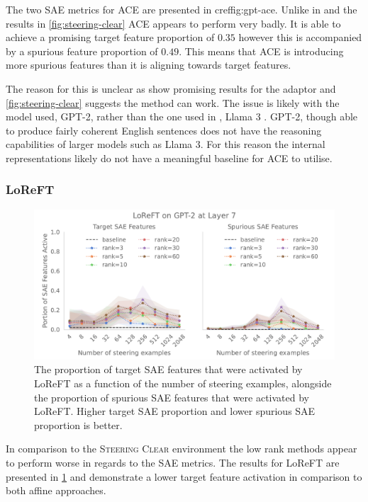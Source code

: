The two SAE metrics for ACE are presented in cref{fig:gpt-ace}.
Unlike in \citet{ace} and the results in \cref{fig:steering-clear} ACE appears to perform very badly.
It is able to achieve a promising target feature proportion of $0.35$ however this is accompanied by a spurious feature proportion of $0.49$.
This means that ACE is introducing more spurious features than it is aligning towards target features.

The reason for this is unclear as \citet{ace} show promising results for the adaptor and \cref{fig:steering-clear} suggests the method can work.
The issue is likely with the model used, GPT-2, rather than the one used in \citet{ace}, Llama 3 \citep{llama3}.
GPT-2, though able to produce fairly coherent English sentences does not have the reasoning capabilities of larger models such as Llama 3.
For this reason the internal representations likely do not have a meaningful baseline for ACE to utilise.

\subsubsection{LoReFT}

\begin{figure}
    \centering
    \captionsetup{width=.9\textwidth}
    \includegraphics[width=\textwidth]{figures/gpt2_7_loreft.pdf}
    \caption{
        The proportion of target SAE features that were activated by LoReFT as a function of the number of steering examples, alongside the proportion of spurious SAE features that were activated by LoReFT.
        Higher target SAE proportion and lower spurious SAE proportion is better.
    }
    \label{fig:gpt-loreft}
\end{figure}

In comparison to the \textsc{Steering Clear} environment the low rank methods appear to perform worse in regards to the SAE metrics.
The results for LoReFT are presented in \cref{fig:gpt-loreft} and demonstrate a lower target feature activation in comparison to both affine approaches.

